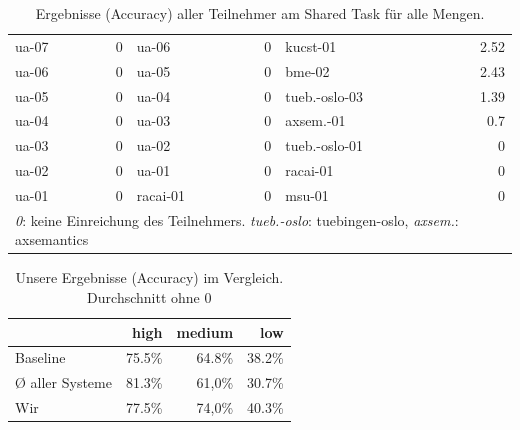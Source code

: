 \documentclass[a4paper]{article}
\begin{document}
\begin{table}
\begin{tabular}{lr|lr|lr}
ua-07                      & 0                      & ua-06                      & 0                       & kucst-01                   & 2.52                   \\
ua-06                      & 0                      & ua-05                      & 0                       & bme-02                     & 2.43                   \\
ua-05                      & 0                      & ua-04                      & 0                       & tueb.-oslo-03          & 1.39                   \\
ua-04                      & 0                      & ua-03                      & 0                       & axsem.-01             & 0.7                    \\
ua-03                      & 0                      & ua-02                      & 0                       & tueb.-oslo-01          & 0                      \\
ua-02                      & 0                      & ua-01                      & 0                       & racai-01                   & 0                      \\
ua-01                      & 0                      & racai-01                   & 0                       & msu-01                     & 0         
\\
\bottomrule
\multicolumn{6}{l}{\textit{0}: keine Einreichung des Teilnehmers. \textit{tueb.-oslo}: tuebingen-oslo, \textit{axsem.}: axsemantics}
\end{tabular}

\caption{Ergebnisse (Accuracy) aller Teilnehmer am Shared Task für alle Mengen.}
\label{fig:results_all}
\end{table}

\begin{table}
\centering
\begin{tabular}{lrrr}
\toprule
                 & high   & medium & low    \\
                 \midrule
Baseline         & 75.5\% & 64.8\% & 38.2\% \\
Ø aller Systeme & 81.3\% & 61,0\% & 30.7\% \\
Wir              & 77.5\% & 74,0\% & 40.3\% \\
\bottomrule
\end{tabular}
\caption{Unsere Ergebnisse (Accuracy) im Vergleich.  Durchschnitt ohne $0$}
\label{fig:acc_comparison}
\end{table}
\end{document}
